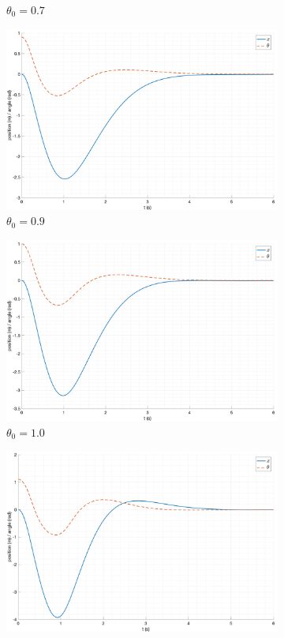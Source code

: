 \begin{figure}[ht!]
\begin{subfigure}[b]{0.45\textwidth}
        \caption{$\theta_0 = 0.7$}
    \end{subfigure}
    \begin{subfigure}[b]{0.45\textwidth}
        \includegraphics[width=\textwidth]{media/plots/modal_control/out_3.png}
        \caption{$\theta_0 = 0.9$}
    \end{subfigure}
    \begin{subfigure}[b]{0.45\textwidth}
        \includegraphics[width=\textwidth]{media/plots/modal_control/out_4.png}
        \caption{$\theta_0 = 1.0$}
    \end{subfigure}
    \begin{subfigure}[b]{0.45\textwidth}
        \includegraphics[width=\textwidth]{media/plots/modal_control/out_5.png}

\end{subfigure}
\end{figure}
